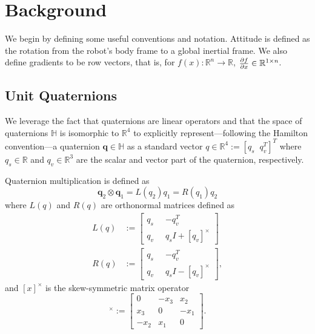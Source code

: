 \documentclass[letterpaper, 10 pt, conference]{ieeeconf}  %
\newcommand{\R}{\mathbb{R}}
\newcommand{\skewmat}[1]{[#1]^\times}
\newcommand{\q}{\textbf{q}}
\begin{document}
\section{Background}

    We begin by defining some useful conventions and notation. 
    Attitude is defined as the rotation from the robot's body frame to a global inertial 
        frame. 
    We also define gradients to be row vectors, that is, for 
        $f(x) : \R^n \to \R$, $\pdv{f}{x} \in \R^{1\times n}$.

    \subsection{Unit Quaternions} \label{sec:quaternions}
        We leverage the fact that quaternions are linear operators and that the space of 
        quaternions $\mathbb{H}$ is isomorphic to $\R^4$ to explicitly 
        represent---following the Hamilton convention---a quaternion $\q \in \mathbb{H}$ as 
        a standard vector $q \in \R^4 := [q_s \;\; q_v^T]^T$ where $q_s \in \R$ and 
        $q_v \in \R^3$ are the scalar and vector part of the quaternion, respectively.
        
        Quaternion multiplication is defined as
        \begin{equation} \label{eq:quat_mult}
            \q_2 \otimes \q_1 = L(q_2) q_1 = R(q_1) q_2
        \end{equation}
        where $L(q)$ and $R(q)$ are orthonormal matrices defined as
        \begin{align}
            L(q) &:= \begin{bmatrix} 
                q_s \;\; & -q_v^T \\ 
                q_v \;\; & q_s I + \skewmat{q_v} 
            \end{bmatrix} 
            \label{eq:Lmult} \\
            R(q) &:=\begin{bmatrix} 
                q_s \;\; & -q_v^T \\ 
                q_v \;\; & q_s I - \skewmat{q_v} 
            \end{bmatrix} \label{eq:Rmult},
        \end{align}
        and $\skewmat{x}$ is the skew-symmetric matrix operator
        \begin{equation}
            \skewmat{x} := \begin{bmatrix} 
                0 & -x_3 & x_2 \\ 
                x_3 & 0 & -x_1\\ 
                -x_2 & x_1 & 0 
            \end{bmatrix}.
        \end{equation}
        
\end{document}
